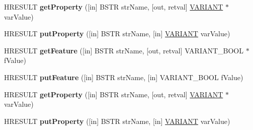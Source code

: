 \begin{DoxyCompactItemize}
\item 
\mbox{\label{interface_m_s_x_m_l2_1_1_i_m_x_x_m_l_filter_a80eb32493dc137061fe837ecb424af9a}} 
H\+R\+E\+S\+U\+LT {\bfseries get\+Property} (\mbox{[}in\mbox{]} B\+S\+TR str\+Name, \mbox{[}out, retval\mbox{]} \hyperlink{structtag_v_a_r_i_a_n_t}{V\+A\+R\+I\+A\+NT} $\ast$var\+Value)
\item 
\mbox{\label{interface_m_s_x_m_l2_1_1_i_m_x_x_m_l_filter_ae9e3ce45564337260d4661a3b9bb1a06}} 
H\+R\+E\+S\+U\+LT {\bfseries put\+Property} (\mbox{[}in\mbox{]} B\+S\+TR str\+Name, \mbox{[}in\mbox{]} \hyperlink{structtag_v_a_r_i_a_n_t}{V\+A\+R\+I\+A\+NT} var\+Value)
\item 
\mbox{\label{interface_m_s_x_m_l2_1_1_i_m_x_x_m_l_filter_a4b58d7b1e852fa7b5a01e8c14caf6848}} 
H\+R\+E\+S\+U\+LT {\bfseries get\+Feature} (\mbox{[}in\mbox{]} B\+S\+TR str\+Name, \mbox{[}out, retval\mbox{]} V\+A\+R\+I\+A\+N\+T\+\_\+\+B\+O\+OL $\ast$f\+Value)
\item 
\mbox{\label{interface_m_s_x_m_l2_1_1_i_m_x_x_m_l_filter_adbee1039f6c49c3e7e6eb96d282411af}} 
H\+R\+E\+S\+U\+LT {\bfseries put\+Feature} (\mbox{[}in\mbox{]} B\+S\+TR str\+Name, \mbox{[}in\mbox{]} V\+A\+R\+I\+A\+N\+T\+\_\+\+B\+O\+OL f\+Value)
\item 
\mbox{\label{interface_m_s_x_m_l2_1_1_i_m_x_x_m_l_filter_a80eb32493dc137061fe837ecb424af9a}} 
H\+R\+E\+S\+U\+LT {\bfseries get\+Property} (\mbox{[}in\mbox{]} B\+S\+TR str\+Name, \mbox{[}out, retval\mbox{]} \hyperlink{structtag_v_a_r_i_a_n_t}{V\+A\+R\+I\+A\+NT} $\ast$var\+Value)
\item 
\mbox{\label{interface_m_s_x_m_l2_1_1_i_m_x_x_m_l_filter_ae9e3ce45564337260d4661a3b9bb1a06}} 
H\+R\+E\+S\+U\+LT {\bfseries put\+Property} (\mbox{[}in\mbox{]} B\+S\+TR str\+Name, \mbox{[}in\mbox{]} \hyperlink{structtag_v_a_r_i_a_n_t}{V\+A\+R\+I\+A\+NT} var\+Value)
\end{DoxyCompactItemize}
